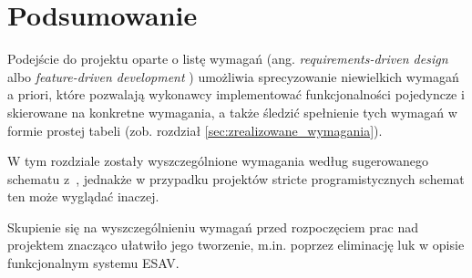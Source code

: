 \section{Podsumowanie}
\label{sec:wstep_podsumowanie}

Podejście do projektu oparte o listę wymagań (ang. \textit{requirements-driven design} \cite{Hug10} albo \textit{feature-driven development} \cite{Goy08}) umożliwia sprecyzowanie niewielkich wymagań a priori, które pozwalają wykonawcy implementować funkcjonalności pojedyncze i skierowane na konkretne wymagania, a także śledzić spełnienie tych wymagań w formie prostej tabeli (zob. rozdział \ref{sec:zrealizowane_wymagania}).

W tym rozdziale zostały wyszczególnione wymagania według sugerowanego schematu z~\cite{Hug10}, jednakże w przypadku projektów stricte programistycznych schemat ten może wyglądać inaczej.

Skupienie się na wyszczególnieniu wymagań przed rozpoczęciem prac nad projektem znacząco ułatwiło jego tworzenie, m.in. poprzez eliminację luk w opisie funkcjonalnym systemu ESAV.

